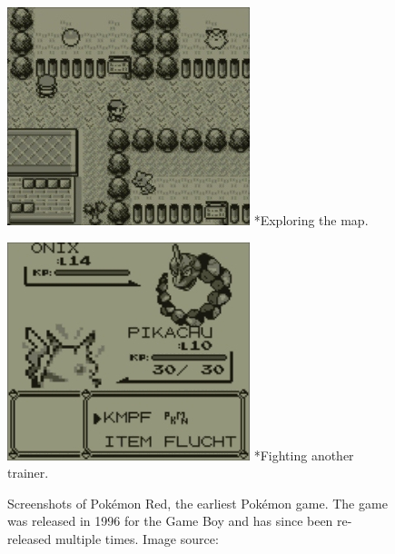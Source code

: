\begin{figure}[ht]
  \centering
  \begin{minipage}{.5\textwidth}
    \centering
    \includegraphics[width=.95\linewidth]{images/Red-0.jpg}
    \captionsetup{margin=0.5cm}
    *{Exploring the map.}
  \end{minipage}%
  \begin{minipage}{.5\textwidth}
    \centering
    \includegraphics[width=.95\linewidth]{images/Red-1.jpg}
    \captionsetup{margin=0.5cm}
    *{Fighting another trainer.}
  \end{minipage}
  \captionsetup{justification=centering,margin=1cm}
  \caption{Screenshots of Pokémon Red, the earliest Pokémon game. The game was released in 1996 for the Game Boy and has since been re-released multiple times. 
  Image source:~\autocite{Nintendo:PokemonRed}}
  \label{fig:screenshot-red}
\end{figure}
